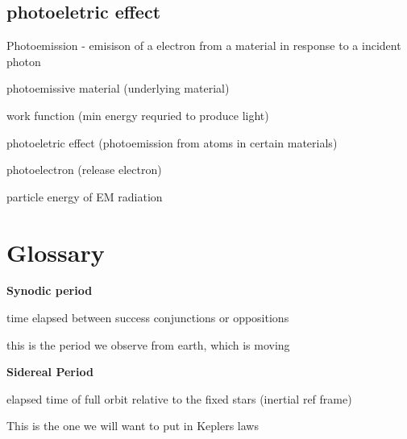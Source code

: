 \documentclass{article}
\begin{document}
\subsection{photoeletric effect}
\begin{list}{-}{}
\item Photoemission - emisison of a electron from a material in response to a incident photon
\begin{list}{-}{}
\item photoemissive material (underlying material)
\item work function (min energy requried to produce light)
\item photoeletric effect (photoemission from atoms in certain materials)
\item photoelectron (release electron)
\end{list}
\item particle energy of EM radiation 
\end{list}













\pagebreak
\section{Glossary}

\textbf{\large Synodic period }

\begin{list}{-}{}
\item time elapsed between success conjunctions or oppositions
\item this is the period we observe from earth, which is moving
\end{list}
\noindent
\textbf{\large Sidereal Period} 
\begin{list}{-}{}
\item elapsed time of full orbit relative to the fixed stars (inertial ref frame)
\item This is the one we will want to put in Keplers laws
\end{list}
\end{document}
